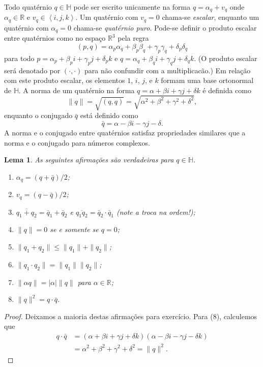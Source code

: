 \documentclass[12pt]{amsart}
\newcommand{\Ha}{\mathbb H}
\newcommand{\R}{\mathbb R}
\newtheorem{lemma}[theorem]{Lema}
\theoremstyle{definition}
\begin{document}
Todo quatérnio $q\in\Ha$ pode ser escrito unicamente na forma $q=\alpha_q+v_q$ onde $\alpha_q\in\R$ e 
$v_q\in\left<i,j,k\right>$. Um quatérnio com $v_q=0$ chama-se \emph{escalar}, enquanto um quatérnio com 
$\alpha_q=0$ chama-se \emph{quatérnio puro}. Pode-se definir o produto escalar entre quatérnios como no espaço
$\R^3$ pela regra
\[
    (p,q)=\alpha_p\alpha_q+\beta_p\beta_q+\gamma_p\gamma_q+\delta_p\delta_q
\]
para todo $p=\alpha_p+\beta_pi+\gamma_pj+\delta_pk$ e $q=\alpha_q+\beta_qi+\gamma_qj+\delta_qk$.
(O produto escalar será denotado por $(\cdot,\cdot)$ para não confundir com a multiplicacão.)
Em relação com este produto escalar, os elementos $1$, $i$, $j$, e $k$ formam uma base ortonormal de 
$\Ha$.
A norma de um quatérnio na forma $q=\alpha+\beta i+\gamma j+\delta k$ é definida como 
\[
    \|q\|=\sqrt{(q,q)}=\sqrt{\alpha^2+\beta^2+\gamma^2+\delta^2},
\]
enquanto o conjugado $\bar q$ está definido como 
\[
    \bar q=\alpha-\beta i-\gamma j-\delta.
\]
A norma e o conjugado entre quatérnios satisfaz propriedades similares que a norma e o 
conjugado para números complexos.

\begin{lemma}
    As seguintes afirmações são verdadeiras para $q\in\Ha$.
    \begin{enumerate}
        \item $\alpha_q=(q+\bar q)/2$; 
        \item $v_q=(q-\bar q)/2$;
        \item $\overline{q_1+q_2}=\bar q_1+\bar q_2$ e $\overline{q_1q_2}=\bar q_2\cdot \bar q_1$ (note a troca na ordem!);
        \item $\|q\|=0$ se e somente se $q=0$;
        \item $\|q_1+q_2\|\leq \|q_1\|+ \|q_2\|$;
        \item  $\|q_1\cdot q_2\|= \|q_1\|\|q_2\|$;
        \item $\|\alpha q\|=|\alpha|\|q\|$ para $\alpha\in\R$;
        \item $\|q\|^2=q\cdot \bar q$.
    \end{enumerate}
\end{lemma}
\begin{proof}
    Deixamos a maioria destas afirmações para exercício. 
    Para (8), calculemos que 
    \begin{align*}
        q\cdot \bar q&=(\alpha+\beta i+\gamma j+\delta k)(\alpha-\beta i-\gamma j-\delta k)\\&= 
        \alpha^2+\beta^2+\gamma^2+\delta^2=\|q\|^2.
    \end{align*}
\end{proof}
\end{document}
